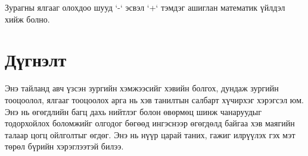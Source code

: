 Зурагны ялгааг олохдоо шууд `-` эсвэл `+` тэмдэг ашиглан математик үйлдэл хийж болно.

\section{Дүгнэлт}

Энэ тайланд авч үзсэн зургийн хэмжээсийг хэвийн болгох, дундаж зургийн тооцоолол, ялгааг тооцоолох арга нь хэв танилтын салбарт хүчирхэг хэрэгсэл юм. Энэ нь өгөгдлийн багц дахь нийтлэг болон өвөрмөц шинж чанаруудыг тодорхойлох боломжийг олгодог бөгөөд ингэснээр өгөгдөлд байгаа хэв маягийн талаар цогц ойлголтыг өгдөг. Энэ нь нүүр царай таних, гажиг илрүүлэх гэх мэт төрөл бүрийн хэрэглээтэй билээ.

